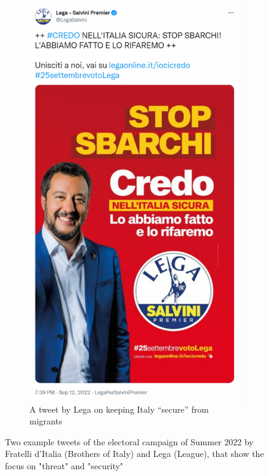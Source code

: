 \documentclass[sigchi]{acmart}
\begin{document}
\begin{figure}[h]
\begin{subfigure}{.4\columnwidth}
  \includegraphics[width=\linewidth]{report/img/Salvini_tweet.png}
  \caption{A tweet by Lega on keeping Italy “secure” from migrants}
  \label{fig:salvini tweet}
\end{subfigure}
\caption{Two example tweets of the electoral campaign of Summer 2022 by Fratelli d'Italia (Brothers of Italy) and Lega (League), that show the focus on "threat" and "security"}
\label{fig:righttweet}
\end{figure}
\end{document}
